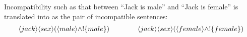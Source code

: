 
Incompatibility such as that between ``Jack is male'' and ``Jack is
female'' is translated into \cathoristic{} as the pair of incompatible
sentences:
\begin{eqnarray*}
\langle jack \rangle \langle sex \rangle (\langle male \rangle \land ! \{male\}) 
   \qquad\qquad
\langle jack \rangle \langle sex \rangle (\langle female \rangle \land ! \{female\})
\end{eqnarray*}

